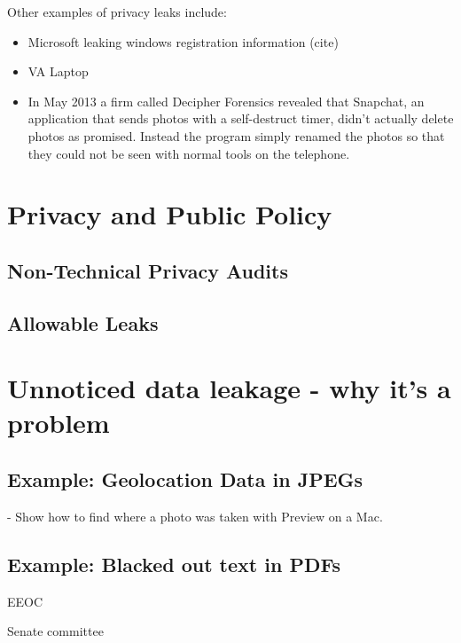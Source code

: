


Other examples of privacy leaks include:
\begin{itemize}
\item Microsoft leaking windows registration information (cite)
\item VA Laptop
\item In May 2013 a firm called Decipher Forensics revealed that Snapchat, an application that sends photos with a
  self-destruct timer, didn't actually delete photos as
  promised. Instead the program simply renamed the photos so that they
  could not be seen with normal tools on the telephone\cite{ksl-snap-chat}.
\end{itemize}



\section{Privacy and Public Policy }

\subsection{Non-Technical Privacy Audits}

\subsection{Allowable Leaks}

\section{Unnoticed data leakage - why it's a problem}
\subsection{Example: Geolocation Data in JPEGs}
  - Show how to find where a photo was taken with Preview on a Mac. 
\subsection{Example: Blacked out text in PDFs}
EEOC

Senate committee

